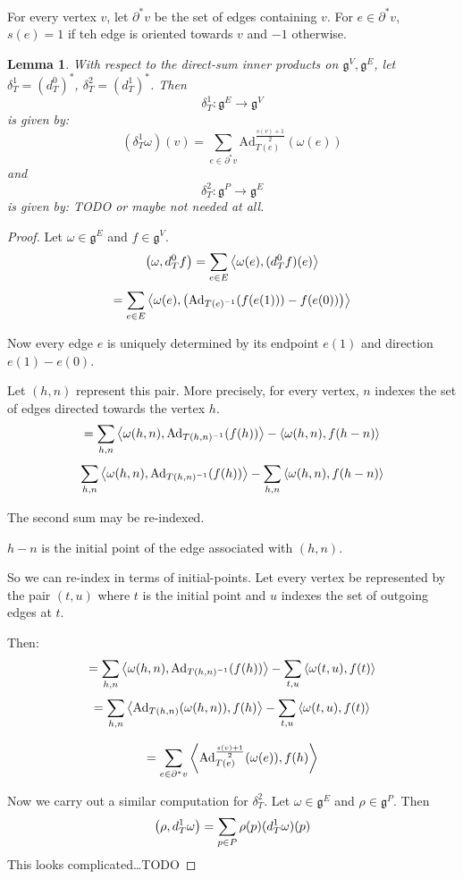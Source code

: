 \documentclass[11pt]{amsart}
\numberwithin{theorem}{subsection}
\newtheorem{lemma}{Lemma}
\numberwithin{lemma}{subsection}
\numberwithin{corollary}{subsection}
\numberwithin{definition}{subsection}
\numberwithin{prop}{subsection}
\begin{document}
For every vertex $v$, let $\partial^\ast v$ be the set of edges containing $v$.
For $e\in \partial^\ast v$, $s(e)=1$ if teh edge is oriented towards $v$ and $-1$ otherwise.
\begin{lemma}
With respect to the direct-sum inner products on $\mathfrak{g}^V, \mathfrak{g}^E$, 
let $\delta^1_T=(d_T^0)^\ast$, $\delta^2_T = (d_T^1)^\ast$.
Then 
\[\delta_T^1:\mathfrak{g}^E\to \mathfrak{g}^V\]
is given by:
\[(\delta_T^1 \omega)(v)=\sum_{e\in \partial^\ast v} \text{Ad}^{\frac{s(v)+1}{2}}_{T(e)}(\omega(e))\]
and 
\[\delta_T^2:\mathfrak{g}^P\to\mathfrak{g}^E\]
is given by: TODO or maybe not needed at all.
\end{lemma}
\begin{proof}
Let $\omega\in\mathfrak{g}^E$ and $f\in\mathfrak{g}^V$.
\[\qty(\omega, d_T^0 f)=\sum_{e\in E} \ev{\omega(e),(d_T^0f)(e)}\]
\[=\sum_{e\in E}\ev{\omega(e),\qty(\text{Ad}_{T(e)^{-1}}(f(e(1))) - f(e(0)))}\]

Now every edge $e$ is uniquely determined by its endpoint $e(1)$ and direction $e(1)-e(0)$.

Let $(h, n)$ represent this pair. More precisely, for every vertex, $n$ indexes the set of edges directed towards the vertex $h$.
\[=\sum_{h,n}\ev{\omega(h,n),\text{Ad}_{T(h,n)^{-1}}(f(h))} - \ev{\omega(h,n),f(h-n)}\]
\[\sum_{h,n}\ev{\omega(h,n),\text{Ad}_{T(h,n)^{-1}}(f(h))} - \sum_{h,n}\ev{\omega(h,n),f(h-n)}\]

The second sum may be re-indexed.

$h-n$ is the initial point of the edge associated with $(h,n)$.

So we can re-index in terms of initial-points. Let every vertex be represented by the pair $(t, u)$
where $t$ is the initial point and $u$ indexes the set of outgoing edges at $t$.

Then:
\[=\sum_{h,n}\ev{\omega(h,n),\text{Ad}_{T(h,n)^{-1}}(f(h))} - \sum_{t,u}\ev{\omega(t,u),f(t)}\]
\[=\sum_{h,n}\ev{\text{Ad}_{T(h,n)}(\omega(h,n)),f(h)} - \sum_{t,u}\ev{\omega(t,u),f(t)}\]

\[=\sum_{e\in \partial^\ast v} \ev{\text{Ad}^{\frac{s(v)+1}{2}}_{T(e)}(\omega(e)),f(h)}\]


Now we carry out a similar computation for $\delta_T^2$. Let $\omega\in \mathfrak{g}^E$ and $\rho\in \mathfrak{g}^P$.
Then 
\[\qty(\rho, d_T^1 \omega) = \sum_{p\in P} \rho(p)(d_T^1 \omega)(p)\]
This looks complicated\dots TODO


\end{proof}
\end{document}
